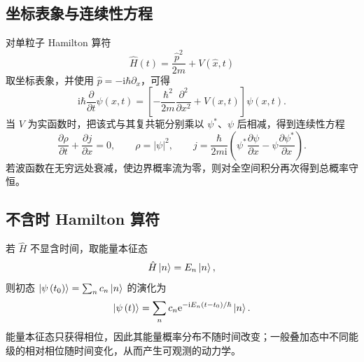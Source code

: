\subsection{坐标表象与连续性方程}
对单粒子 Hamilton 算符
\begin{equation}
\hat H\left(t\right)=\frac{\hat p^2}{2m}+V\left(\hat x,t\right)
\end{equation}
取坐标表象，并使用 $\hat p=-\mathrm{i}\hbar\partial_x$，可得
\begin{equation}
\boxed{\mathrm{i}\hbar\frac{\partial}{\partial t}\psi\left(x,t\right)
=\left[-\frac{\hbar^2}{2m}\frac{\partial^2}{\partial x^2}+V\left(x,t\right)\right]
\psi\left(x,t\right).}
\label{eq:tdse-position}
\end{equation}
当 $V$ 为实函数时，把该式与其复共轭分别乘以 $\psi^*$、$\psi$ 后相减，得到连续性方程
\begin{equation}
\frac{\partial\rho}{\partial t}+\frac{\partial j}{\partial x}=0,
\qquad
\rho=\left|\psi\right|^2,
\qquad
j=\frac{\hbar}{2m\mathrm{i}}
\left(\psi^*\frac{\partial\psi}{\partial x}-\psi\frac{\partial\psi^*}{\partial x}\right).
\end{equation}
若波函数在无穷远处衰减，使边界概率流为零，则对全空间积分再次得到总概率守恒。

\subsection{不含时 Hamilton 算符}
若 $\hat H$ 不显含时间，取能量本征态
\begin{equation}
\hat H\Ket{n}=E_n\Ket{n},
\end{equation}
则初态 $\Ket{\psi\left(t_0\right)}=\sum_n c_n\Ket{n}$ 的演化为
\begin{equation}
\Ket{\psi\left(t\right)}
=\sum_n c_n\mathrm{e}^{-\mathrm{i}E_n\left(t-t_0\right)/\hbar}\Ket{n}.
\end{equation}
能量本征态只获得相位，因此其能量概率分布不随时间改变；一般叠加态中不同能级的相对相位随时间变化，从而产生可观测的动力学。

